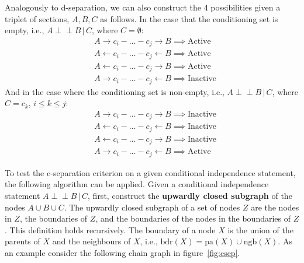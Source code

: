 \documentclass{article}
\newcommand{\indep}{\perp \!\!\! \perp}
\begin{document}
\noindent Analogously to d-separation, we can also construct the 4 possibilities given a triplet of sections, $A, B, C$ as follows. In the case that the conditioning set is empty, i.e., $A \indep B \,|\, C$, where $C = \emptyset$:
\begin{align*}
    & A \rightarrow c_i - \dots - c_j \rightarrow B \implies \text{Active}\\
    & A \leftarrow c_i - \dots - c_j \leftarrow B \implies \text{Active} \\
    & A \leftarrow c_i - \dots - c_j \rightarrow B \implies \text{Active}\\
    & A \rightarrow c_i - \dots - c_j \leftarrow B\implies \text{Inactive}
\end{align*}
\noindent And in the case where the conditioning set is non-empty, i.e., $A \indep B \,|\, C$, where $C = c_k$, $i \leq k \leq j$:
\begin{align*}
    & A \rightarrow c_i - \dots - c_j \rightarrow B \implies \text{Inactive}\\
    & A \leftarrow c_i - \dots - c_j \leftarrow B \implies \text{Inactive} \\
    & A \leftarrow c_i - \dots - c_j \rightarrow B \implies \text{Inactive}\\
    & A \rightarrow c_i - \dots - c_j \leftarrow B\implies \text{Active}
\end{align*}

\noindent To test the c-separation criterion on a given conditional independence statement, the following algorithm can be applied. Given a conditional independence statement $A \indep B \,|\, C$, first, construct the \textbf{upwardly closed subgraph} of the nodes $A \cup B \cup C$. The upwardly closed subgraph of a set of nodes $Z$ are the nodes in $Z$, the boundaries of $Z$, and the boundaries of the nodes in the boundaries of $Z$. This definition holds recursively. The boundary of a node $X$ is the union of the parents of $X$ and the neighbours of $X$, i.e., $\text{bdr}(X) = \text{pa}(X) \cup \text{ngb}(X)$. As an example consider the following chain graph in figure~\ref{fig:csep}. 
\end{document}
